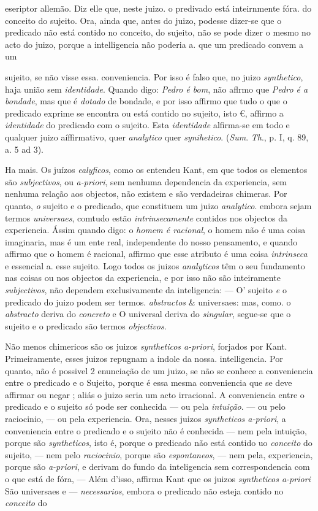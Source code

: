 eseriptor allemão. Diz elle que, neste juizo. o predivado está inteirnmente fóra. do conceito do sujeito. Ora, ainda que, antes do juizo, podesse dizer-se que o predicado não está contido no conceito, do sujeito, não se pode dizer o mesmo no acto do juizo, porque a intelligencia não poderia a. que um predicado convem a um\par sujeito, se não visse essa. conveniencia. Por isso é falso que, no juizo \emph{synthetico}, haja união sem \emph{identidade}. Quando digo: \emph{Pedro é bom}, não aflrmo que \emph{Pedro é a bondade}, mas que é \emph{dotado} de bondade, e por isso affirmo que tudo o que o predicado exprime se encontra ou está contido no sujeito, isto €, affirmo a \emph{identidade} do predicado com o sujeito. Esta \emph{identidade} alfirma-se em todo e qualquer juizo aíffirmativo, quer \emph{analytico} quer \emph{synihetico}. (\emph{Sum}. \emph{Th}., p. I, q. 89, a. 5 ad 3).\par Ha mais. Os juízos \emph{ealyficos}, como os entendeu Kant, em que todos os elementos são \emph{subjectivos}, ou \emph{a-priori}, sem nenhuma dependencia da experiencia, sem nenhuma relação aos objectos, não existem e são verdadeiras chimeras. Por quanto, \emph{o} sujeito e o predicado, que constituem um juizo \emph{analytico}. embora sejam termos \emph{universaes}, comtudo estão \emph{intrinsecamente} contidos nos objectos da experiencia. Ássim quando digo: o \emph{homem é racional}, o homem não é uma coisa imaginaria, mas é um ente real, independente do nosso pensamento, e quando affirmo que o homem é racional, affirmo que esse atributo é uma coisa \emph{intrinseca} e essencial a. esse sujeito. Logo todos os juizos \emph{analyticos} têm o seu fundamento nas coisas ou nos objectos da experiencia, e por isso não são inteiramente \emph{subjectivos}, não dependem exclusivamente da inteligencia: --- O' sujeito \emph{e} o predicado do juizo podem ser termos. \emph{abstractos} \& universaes: mas, como. o \emph{abstracto} deriva do \emph{concreto} e O universal deriva do \emph{singular}, segue-se que o sujeito e o predicado são termos \emph{objectivos}.\par Não menos chimericos são os juizos \emph{syntheticos a-priori}, forjados por Kant. Primeiramente, esses juizos repugnam a indole da nossa. intelligencia. Por quanto, não é possivel 2 enunciação de um juizo, se não se conhece a conveniencia entre o predicado e o Sujeito, porque é essa mesma conveniencia que se deve affirmar ou negar ; aliás o juizo seria um acto irracional. A conveniencia entre o predicado e o sujeito só pode ser conhecida --- ou pela \emph{intuição}. --- ou pelo raciocinio, --- ou pela experiencia. Ora, nesses juizos \emph{syntheticos a-priori}, a conveniencia entre o predicado e o sujeito não é conhecida --- nem pela intuição, porque são \emph{syntheticos}, isto é, porque o predicado não está contido uo \emph{conceito} do sujeito, --- nem pelo \emph{raciocinio}, porque são \emph{espontaneos}, --- nem pela, experiencia, porque são \emph{a-priori}, e derivam do fundo da inteligencia sem correspondencia com o que está de fóra, --- Além d'isso, affirma Kant que os juizos \emph{syntheticos a-priori} São universaes e --- \emph{necessarios}, embora o predicado não esteja contido no \emph{conceito} do 